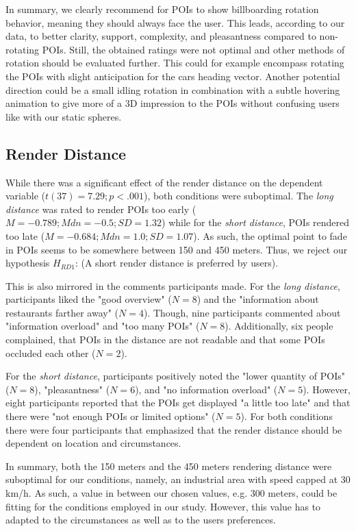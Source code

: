 In summary, we clearly recommend for POIs to show billboarding rotation behavior, meaning they should always face the user. This leads, according to our data, to better clarity, support, complexity, and pleasantness compared to non-rotating POIs. Still, the obtained ratings were not optimal and other methods of rotation should be evaluated further. This could for example encompass rotating the POIs with slight anticipation for the cars heading vector. Another potential direction could be a small idling rotation in combination with a subtle hovering animation to give more of a 3D impression to the POIs without confusing users like with our static spheres.



\subsection{Render Distance}
While there was a significant effect of the render distance on the dependent variable ($t(37)=7.29; p<.001$), both conditions were suboptimal. The \textit{long distance} was rated to render POIs too early ($M=-0.789; Mdn=-0.5; SD=1.32$) while for the \textit{short distance}, POIs rendered too late ($M=-0.684; Mdn=1.0; SD=1.07$). As such, the optimal point to fade in POIs seems to be somewhere between 150 and 450 meters. Thus, we reject our hypothesis $H_{RD1}$: (A short render distance is preferred by users). 

This is also mirrored in the comments participants made. For the \textit{long distance}, participants liked the "good overview" ($N=8$) and the "information about restaurants farther away" ($N=4$). Though, nine participants commented about "information overload" and "too many POIs" ($N=8$). Additionally, six people complained, that POIs in the distance are not readable and that some POIs occluded each other ($N=2$). 

For the \textit{short distance}, participants positively noted the "lower quantity of POIs" ($N=8$), "pleasantness" ($N=6$), and "no information overload" ($N=5$). However, eight participants reported that the POIs get displayed "a little too late" and that there were "not enough POIs or limited options" ($N=5$). For both conditions there were four participants that emphasized that the render distance should be dependent on location and circumstances.

In summary, both the 150 meters and the 450 meters rendering distance were suboptimal for our conditions, namely, an industrial area with speed capped at 30 km/h. As such, a value in between our chosen values, e.g. 300 meters, could be fitting for the conditions employed in our study. However, this value has to adapted to the circumstances as well as to the users preferences.



